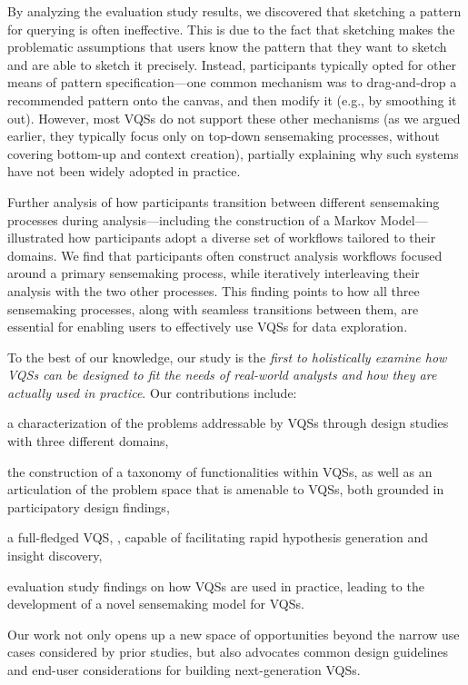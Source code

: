 \par By analyzing the evaluation study results, we discovered that sketching a pattern for querying is often ineffective. This is due to the fact that sketching makes the problematic assumptions that users know the pattern that they want to sketch and are able to sketch it precisely. Instead, participants typically opted for other means of pattern specification---one common mechanism was to drag-and-drop a recommended pattern onto the canvas, and then modify it (e.g., by smoothing it out). However, most VQSs do not support these other mechanisms (as we argued earlier, they typically focus only on top-down sensemaking processes, without covering bottom-up and context creation), partially explaining why such systems have not been widely adopted in practice.
\par Further analysis of how participants
transition between different sensemaking processes
during analysis---including the construction of a Markov Model---illustrated
how participants adopt a diverse set of workflows tailored
to their domains. We find that participants often construct analysis workflows focused around a primary sensemaking process, while iteratively interleaving their analysis with the two other processes. This finding points to how all three sensemaking processes, along with seamless transitions between them, are essential for enabling users to effectively use VQSs for data exploration.%
\par To the best of our knowledge, our study is the \emph{first to holistically examine how VQSs can be designed to fit the needs of real-world
analysts and how they are actually used in practice}. Our contributions include:
\begin{denselist}
\item a characterization of the problems addressable by VQSs through design studies with three different domains,
\item the construction of a taxonomy of functionalities within VQSs, as well as an articulation of the problem space that is amenable to VQSs, both grounded in participatory design findings,
\item a full-fledged VQS, \zvpp, capable of facilitating rapid hypothesis generation and insight discovery,
\item evaluation study findings on how VQSs are used in practice, leading to the development of a novel sensemaking model for VQSs. %
\end{denselist}
Our work not only opens up a new space of opportunities beyond the narrow use cases considered by prior studies, but also advocates common design guidelines and end-user considerations for building next-generation VQSs.

